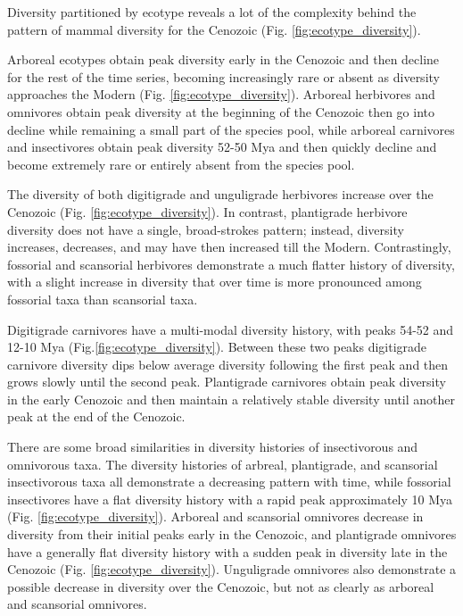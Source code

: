 \documentclass[12pt,letterpaper]{article}
\begin{document}
Diversity partitioned by ecotype reveals a lot of the complexity behind the pattern of mammal diversity for the Cenozoic (Fig. \ref{fig:ecotype_diversity}). 

Arboreal ecotypes obtain peak diversity early in the Cenozoic and then decline for the rest of the time series, becoming increasingly rare or absent as diversity approaches the Modern (Fig. \ref{fig:ecotype_diversity}). Arboreal herbivores and omnivores obtain peak diversity at the beginning of the Cenozoic then go into decline while remaining a small part of the species pool, while arboreal carnivores and insectivores obtain peak diversity 52-50 Mya and then quickly decline and become extremely rare or entirely absent from the species pool.

The diversity of both digitigrade and unguligrade herbivores increase over the Cenozoic (Fig. \ref{fig:ecotype_diversity}). In contrast, plantigrade herbivore diversity does not have a single, broad-strokes pattern; instead, diversity increases, decreases, and may have then increased till the Modern. Contrastingly, fossorial and scansorial herbivores demonstrate a much flatter history of diversity, with a slight increase in diversity that over time is more pronounced among fossorial taxa than scansorial taxa.

Digitigrade carnivores have a multi-modal diversity history, with peaks 54-52 and 12-10 Mya (Fig.\ref{fig:ecotype_diversity}). Between these two peaks digitigrade carnivore diversity dips below average diversity following the first peak and then grows slowly until the second peak. Plantigrade carnivores obtain peak diversity in the early Cenozoic and then maintain a relatively stable diversity until another peak at the end of the Cenozoic.

There are some broad similarities in diversity histories of insectivorous and omnivorous taxa. The diversity histories of arbreal, plantigrade, and scansorial insectivorous taxa all demonstrate a decreasing pattern with time, while fossorial insectivores have a flat diversity history with a rapid peak approximately 10 Mya (Fig. \ref{fig:ecotype_diversity}). Arboreal and scansorial omnivores decrease in diversity from their initial peaks early in the Cenozoic, and plantigrade omnivores have a generally flat diversity history with a sudden peak in diversity late in the Cenozoic (Fig. \ref{fig:ecotype_diversity}). Unguligrade omnivores also demonstrate a possible decrease in diversity over the Cenozoic, but not as clearly as arboreal and scansorial omnivores.
\end{document}
